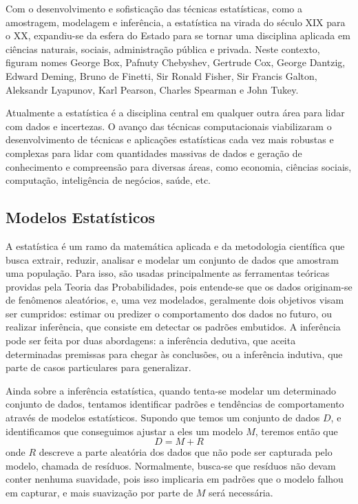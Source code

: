 Com o desenvolvimento e sofisticação das técnicas estatísticas, como a amostragem,
modelagem e inferência, a estatística na virada do século XIX para o XX, expandiu-se
da esfera do Estado para se tornar uma disciplina aplicada em ciências naturais,
sociais, administração pública e privada. Neste contexto, figuram nomes George Box,
Pafnuty Chebyshev, Gertrude Cox, George Dantzig, Edward Deming, Bruno de Finetti,
Sir Ronald Fisher, Sir Francis Galton, Aleksandr Lyapunov, Karl Pearson, Charles Spearman
e John Tukey.

Atualmente a estatística é a disciplina central em qualquer outra área para lidar com
dados e incertezas. O avanço das técnicas computacionais viabilizaram o desenvolvimento
de técnicas e aplicações estatísticas cada vez mais robustas e complexas para lidar
com quantidades massivas de dados e geração de conhecimento e compreensão para diversas
áreas, como economia, ciências sociais, computação, inteligência de negócios, saúde, etc.

\subsection{Modelos Estatísticos}

A estatística é um ramo da matemática aplicada e da metodologia científica
que busca extrair, reduzir, analisar e modelar um conjunto de dados que
amostram uma população. Para isso, são usadas principalmente as ferramentas
teóricas providas pela Teoria das Probabilidades, pois entende-se que os
dados originam-se de fenômenos aleatórios, e, uma vez modelados, geralmente
dois objetivos visam ser cumpridos: estimar ou predizer o comportamento dos
dados no futuro, ou realizar inferência, que consiste em detectar os padrões
embutidos. A inferência pode ser feita por duas abordagens: a inferência
dedutiva, que aceita determinadas premissas para chegar às conclusões, ou
a inferência indutiva, que parte de casos particulares para generalizar.

Ainda sobre a inferência estatística, quando tenta-se modelar um determinado
conjunto de dados, tentamos identificar padrões e tendências de comportamento
através de modelos estatísticos. Supondo que temos um conjunto de dados $D$,
e identificamos que conseguimos ajustar a eles um modelo $M$, teremos então que
\[
	D = M + R
\]
onde $R$ descreve a parte aleatória dos dados que não pode ser capturada pelo
modelo, chamada de resíduos. Normalmente, busca-se que resíduos não devam conter nenhuma
suavidade, pois isso implicaria em padrões que o modelo falhou em capturar, e mais
suavização por parte de $M$ será necessária.

